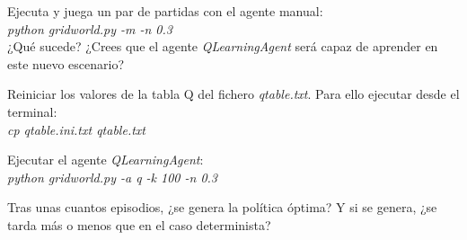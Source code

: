 \documentclass[11pt]{exam}
\begin{document}
\begin{questions}

{ \question Ejecuta y juega un par de partidas con el agente manual: \\ \textit{python gridworld.py -m -n 0.3} \\ ¿Qué sucede? ¿Crees que el agente \textit{QLearningAgent} será capaz de aprender en este nuevo escenario?
}

{ \question Reiniciar los valores de la tabla Q del fichero \textit{qtable.txt}. Para ello ejecutar desde el terminal: \\ \textit{cp qtable.ini.txt qtable.txt}
}

{ \question Ejecutar el agente \textit{QLearningAgent}: \\ \textit{python gridworld.py -a q -k 100 -n 0.3}}

{ \question Tras unas cuantos episodios, ¿se genera la política óptima? Y si se genera, ¿se tarda más o menos que en el caso determinista?
}

\end{questions}
\end{document}
